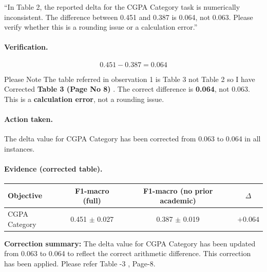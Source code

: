\documentclass[11pt,a4paper]{article}
\newcommand{\stress}[1]{\textbf{#1}}
\begin{document}
\begin{reviewerquote}
``In Table 2, the reported delta for the CGPA Category task is numerically inconsistent. The difference between 0.451 and 0.387 is 0.064, not 0.063. Please verify whether this is a rounding issue or a calculation error.''
\end{reviewerquote}

\paragraph{Verification.}
\[
0.451 - 0.387 = 0.064
\]

Please Note The table referred in observation 1 is Table 3 not Table 2 so I have Corrected  \stress{Table 3 (Page No 8)} . The correct difference is \stress{0.064}, not 0.063. This is a \stress{calculation error}, not a rounding issue.

\paragraph{Action taken.} The delta value for CGPA Category has been corrected from 0.063 to 0.064 in all instances.

\paragraph{Evidence (corrected table).}

\begin{center}\small
\begin{tabular}{l c c c}
\toprule
\textbf{Objective} & \textbf{F1-macro (full)} & \textbf{F1-macro (no prior academic)} & \textbf{$\Delta$} \\
\midrule
CGPA Category & 0.451 $\pm$ 0.027 & 0.387 $\pm$ 0.019 & \stress{$+0.064$} \\
\bottomrule
\end{tabular}
\end{center}

\begin{correctionbox}
\noindent \textbf{Correction summary:} The delta value for CGPA Category has been updated from 0.063 to 0.064 to reflect the correct arithmetic difference. This correction has been applied. Please refer Table -3 , Page-8.
\end{correctionbox}

\end{document}
